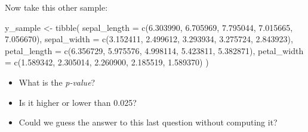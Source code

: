 \documentclass[
  oneside]{book}
\newenvironment{Shaded}{\begin{snugshade}}{\end{snugshade}}
\newcommand{\AttributeTok}[1]{\textcolor[rgb]{0.77,0.63,0.00}{#1}}
\newcommand{\CommentTok}[1]{\textcolor[rgb]{0.56,0.35,0.01}{\textit{#1}}}
\newcommand{\ConstantTok}[1]{\textcolor[rgb]{0.00,0.00,0.00}{#1}}
\newcommand{\DecValTok}[1]{\textcolor[rgb]{0.00,0.00,0.81}{#1}}
\newcommand{\FloatTok}[1]{\textcolor[rgb]{0.00,0.00,0.81}{#1}}
\newcommand{\FunctionTok}[1]{\textcolor[rgb]{0.00,0.00,0.00}{#1}}
\newcommand{\NormalTok}[1]{#1}
\newcommand{\OtherTok}[1]{\textcolor[rgb]{0.56,0.35,0.01}{#1}}
\newcommand{\SpecialCharTok}[1]{\textcolor[rgb]{0.00,0.00,0.00}{#1}}
\providecommand{\tightlist}{%
  \setlength{\itemsep}{0pt}\setlength{\parskip}{0pt}}
\begin{document}
Now take this other sample:

\begin{Shaded}
\begin{Highlighting}[]
\NormalTok{y\_sample }\OtherTok{\textless{}{-}} \FunctionTok{tibble}\NormalTok{(}
  \AttributeTok{sepal\_length =} \FunctionTok{c}\NormalTok{(}\FloatTok{6.303990}\NormalTok{, }\FloatTok{6.705969}\NormalTok{, }\FloatTok{7.795044}\NormalTok{, }\FloatTok{7.015665}\NormalTok{, }\FloatTok{7.056670}\NormalTok{),}
  \AttributeTok{sepal\_width =} \FunctionTok{c}\NormalTok{(}\FloatTok{3.152411}\NormalTok{, }\FloatTok{2.499612}\NormalTok{, }\FloatTok{3.293934}\NormalTok{, }\FloatTok{3.275724}\NormalTok{, }\FloatTok{2.843923}\NormalTok{),}
  \AttributeTok{petal\_length =} \FunctionTok{c}\NormalTok{(}\FloatTok{6.356729}\NormalTok{, }\FloatTok{5.975576}\NormalTok{, }\FloatTok{4.998114}\NormalTok{, }\FloatTok{5.423811}\NormalTok{, }\FloatTok{5.382871}\NormalTok{),}
  \AttributeTok{petal\_width =} \FunctionTok{c}\NormalTok{(}\FloatTok{1.589342}\NormalTok{, }\FloatTok{2.305014}\NormalTok{, }\FloatTok{2.260900}\NormalTok{, }\FloatTok{2.185519}\NormalTok{, }\FloatTok{1.589370}\NormalTok{)}
\NormalTok{)}
\end{Highlighting}
\end{Shaded}

\begin{itemize}
\tightlist
\item
  What is the \emph{p-value}?
\item
  Is it higher or lower than 0.025?
\item
  Could we guess the answer to this last question
  without computing it?
\end{itemize}

\begin{Shaded}
\end{Shaded}
\end{document}
